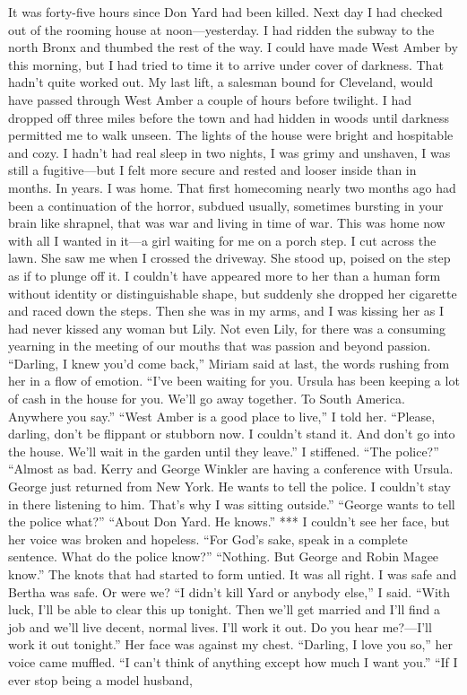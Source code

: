 \documentclass{novel}
\begin{document}

It was forty-five hours since Don Yard had been killed. Next day I had checked out of the rooming house at noon—yesterday. I had ridden the subway to the north Bronx and thumbed the rest of the way. I could have made West Amber by this morning, but I had tried to time it to arrive under cover of darkness. That hadn’t quite worked out. My last lift, a salesman bound for Cleveland, would have passed through West Amber a couple of hours before twilight. I had dropped off three miles before the town and had hidden in woods until darkness permitted me to walk unseen. The lights of the house were bright and hospitable and cozy. I hadn’t had real sleep in two nights, I was grimy and unshaven, I was still a fugitive—but I felt more secure and rested and looser inside than in months. In years. I was home. That first homecoming nearly two months ago had been a continuation of the horror, subdued usually, sometimes bursting in your brain like shrapnel, that was war and living in time of war. This was home now with all I wanted in it—a girl waiting for me on a porch step. I cut across the lawn. She saw me when I crossed the driveway. She stood up, poised on the step as if to plunge off it. I couldn’t have appeared more to her than a human form without identity or distinguishable shape, but suddenly she dropped her cigarette and raced down the steps. Then she was in my arms, and I was kissing her as I had never kissed any woman but Lily. Not even Lily, for there was a consuming yearning in the meeting of our mouths that was passion and beyond passion. “Darling, I knew you’d come back,” Miriam said at last, the words rushing from her in a flow of emotion. “I’ve been waiting for you. Ursula has been keeping a lot of cash in the house for you. We’ll go away together. To South America. Anywhere you say.” “West Amber is a good place to live,” I told her. “Please, darling, don’t be flippant or stubborn now. I couldn’t stand it. And don’t go into the house. We’ll wait in the garden until they leave.” I stiffened. “The police?” “Almost as bad. Kerry and George Winkler are having a conference with Ursula. George just returned from New York. He wants to tell the police. I couldn’t stay in there listening to him. That’s why I was sitting outside.” “George wants to tell the police what?” “About Don Yard. He knows.” *** I couldn’t see her face, but her voice was broken and hopeless. “For God’s sake, speak in a complete sentence. What do the police know?” “Nothing. But George and Robin Magee know.” The knots that had started to form untied. It was all right. I was safe and Bertha was safe. Or were we? “I didn’t kill Yard or anybody else,” I said. “With luck, I’ll be able to clear this up tonight. Then we’ll get married and I’ll find a job and we’ll live decent, normal lives. I’ll work it out. Do you hear me?—I’ll work it out tonight.” Her face was against my chest. “Darling, I love you so,” her voice came muffled. “I can’t think of anything except how much I want you.” “If I ever stop being a model husband, 
\end{document}
